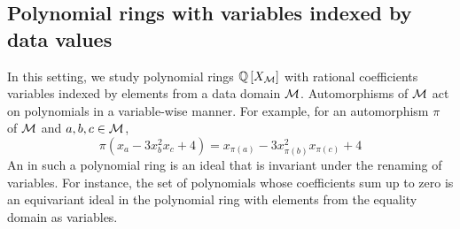 \documentclass[a4paper,11pt]{article}
\begin{document}
%
%
%
%
%
%
%
%
%
%
%
%
%
\subsection{Polynomial rings with variables indexed by data values}\label{sec:poly}
%
In this setting, we study polynomial rings $\mathbb{Q}\left[X_{\mathcal{M}}\right]$ with rational coefficients variables indexed by elements from a data domain $\mathcal{M}$.
Automorphisms of $\mathcal{M}$ act on polynomials in a variable-wise manner.
For example,
for an automorphism $\pi$ of $\mathcal{M}$ and $a,b,c\in\mathcal{M}$,
\[
\pi(x_a - 3x_b^2x_c + 4) = x_{\pi(a)} - 3x_{\pi(b)}^2x_{\pi(c)} + 4
\]
An  in such a polynomial ring is an ideal that is invariant under the renaming of variables.
For instance, the set of polynomials whose coefficients sum up to zero is an equivariant ideal in the polynomial ring with elements from the equality domain as variables.
\end{document}

